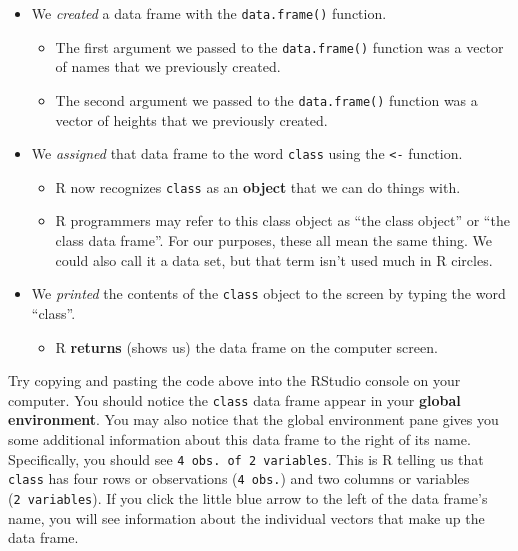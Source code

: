 \documentclass[
  letterpaper,
  DIV=11,
  numbers=noendperiod]{scrreprt}
\providecommand{\tightlist}{%
  \setlength{\itemsep}{0pt}\setlength{\parskip}{0pt}}\usepackage{longtable,booktabs,array}
\begin{document}
\begin{itemize}
\item
  We \emph{created} a data frame with the \texttt{data.frame()}
  function.

  \begin{itemize}
  \item
    The first argument we passed to the \texttt{data.frame()} function
    was a vector of names that we previously created.
  \item
    The second argument we passed to the \texttt{data.frame()} function
    was a vector of heights that we previously created.
  \end{itemize}
\item
  We \emph{assigned} that data frame to the word \texttt{class} using
  the \texttt{\textless{}-} function.

  \begin{itemize}
  \item
    R now recognizes \texttt{class} as an \textbf{object} that we can do
    things with.
  \item
    R programmers may refer to this class object as ``the class object''
    or ``the class data frame''. For our purposes, these all mean the
    same thing. We could also call it a data set, but that term isn't
    used much in R circles.
  \end{itemize}
\item
  We \emph{printed} the contents of the \texttt{class} object to the
  screen by typing the word ``class''.

  \begin{itemize}
  \tightlist
  \item
    R \textbf{returns} (shows us) the data frame on the computer screen.
  \end{itemize}
\end{itemize}

Try copying and pasting the code above into the RStudio console on your
computer. You should notice the \texttt{class} data frame appear in your
\textbf{global environment}. You may also notice that the global
environment pane gives you some additional information about this data
frame to the right of its name. Specifically, you should see
\texttt{4\ obs.\ of\ 2\ variables}. This is R telling us that
\texttt{class} has four rows or observations (\texttt{4\ obs.}) and two
columns or variables (\texttt{2\ variables}). If you click the little
blue arrow to the left of the data frame's name, you will see
information about the individual vectors that make up the data frame.
\end{document}
